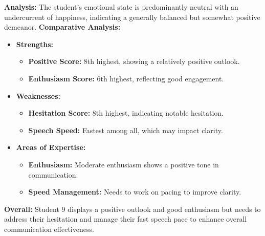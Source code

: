 \documentclass{article}
\begin{document}
    \textbf{Analysis:} The student’s emotional state is predominantly neutral with an undercurrent of happiness, indicating a generally balanced but somewhat positive demeanor.
    \vspace{0.2in}
\textbf{Comparative Analysis:}
\begin{itemize}
    \item \textbf{Strengths:}
    \begin{itemize}
        \item \textbf{Positive Score:} 8th highest, showing a relatively positive outlook.
        \item \textbf{Enthusiasm Score:} 6th highest, reflecting good engagement.
    \end{itemize}
    \item \textbf{Weaknesses:}
    \begin{itemize}
        \item \textbf{Hesitation Score:} 8th highest, indicating notable hesitation.
        \item \textbf{Speech Speed:} Fastest among all, which may impact clarity.
    \end{itemize}
    \item \textbf{Areas of Expertise:}
    \begin{itemize}
        \item \textbf{Enthusiasm:} Moderate enthusiasm shows a positive tone in communication.
        \item \textbf{Speed Management:} Needs to work on pacing to improve clarity.
    \end{itemize}
\end{itemize}

\textbf{Overall:} Student 9 displays a positive outlook and good enthusiasm but needs to address their hesitation and manage their fast speech pace to enhance overall communication effectiveness.
\vspace{0.3in}
\end{document}
